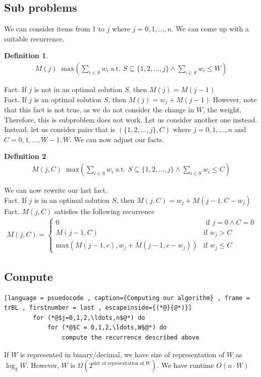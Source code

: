 \documentclass[a4paper]{article}
\theoremstyle{plain}
\newcommand*{\MyDef}{\mathrm{def}}
\newcommand*{\eqdef}{\ensuremath{\mathop{\overset{\MyDef}{=}}}}
\theoremstyle{definition}
\newtheorem{defn}{Definition}[section]
\theoremstyle{remark}
\begin{document}
		\subsection{Sub problems}
		We can consider items from $1$ to $j$ where $j = 0,1,\ldots,n$. We can come up with a suitable recurrence.
		\begin{defn}
			\begin{align*}
			M(j) \eqdef \text{max}\left( \sum_{i \in S}^{} w_i \text{ s.t. } S \subseteq \{1,2,\ldots,j\} \land \sum_{i\in S}^{} w_i \le W \right)
			\end{align*}
		\end{defn}
		Fact. If $j$ is not in an optimal solution $S$, then $M(j) = M(j-1)$ \\
		Fact. If $j$ is an optimal solution $S$, then $M(j) = w_j + M(j-1)$ However, note that this fact is not true, as we do not consider the change in $W$, the weight. Therefore, this is subproblem does not work. Let us consider another one instead. \\
		Instead, let us consider pairs that is $\left( \{1,2,\ldots,j\}, C \right)$ where $j=0,1,\ldots,n$ and $C=0,1,\ldots,W-1,W$. We can now adjust our facts.
		\begin{defn}
			\begin{align*}
				M(j,C) \eqdef  \text{max}\left( \sum_{i \in S}^{} w_i \text{ s.t. } S \subseteq \{1,2,\ldots,j\} \land \sum_{i\in S}^{} w_i \le C \right)
			\end{align*}
		\end{defn}
		We can now rewrite our last fact.\\
		Fact. If $j$ is in an optimal solution $S$, then $M(j,C) = w_j + M(j-1,C-w_j)$ \\
		Fact.  $M(j,C)$ satisfies the following recurrence
		\begin{align*}
			M(j,C) = \begin{cases}
				0 & \text{ if } j=0 \land C = 0 \\
				M(j-1,C) &\text{if } w_j > C \\
				\text{max}\left( M\left( j-1,c \right) , w_j + M(j-1,c-w_j) \right)   & \text{if } w_j \le C
			\end{cases}
		\end{align*}
		\subsection{Compute}
		\begin{lstlisting}[language = psuedocode , caption={Computing our algorithm} , frame = trBL , firstnumber = last , escapeinside={(*@}{@*)}]
		for (*@$j=0,1,2,\ldots,n$@*) do
			for (*@$C = 0,1,2,\ldots,W$@*) do
				compute the recurrence described above
		\end{lstlisting}
		If $W$ is represented in binary/decimal, we have size of representation of $W $ as $\log_2 W$. However, $W$ is $\Omega\left( 2^{\text{size of representation of }W} \right) $. We have runtime $O(n\cdot W)$
\end{document}
